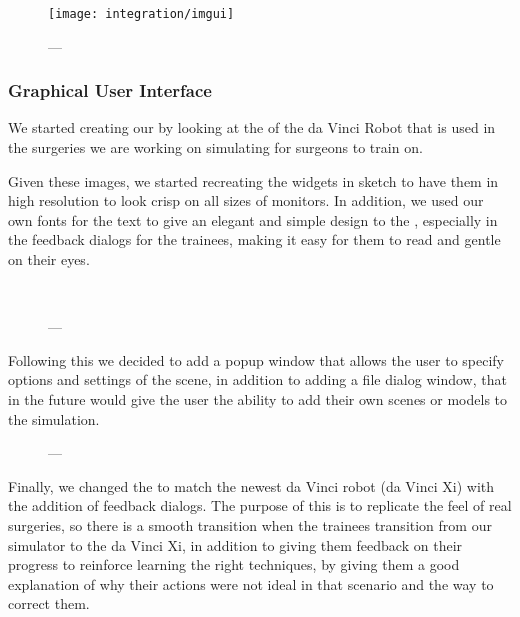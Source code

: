 \begin{figure}
  \centering%
  \texttt{[image: integration/imgui]}
  \caption{---}
  \label{fig:}
\end{figure}

\subsubsection{Graphical User Interface}
\label{ssec:gui}
We started creating our  by looking at the  of the da Vinci Robot that is used in the surgeries we are working on simulating for surgeons to train on.

Given these images, we started recreating the widgets in sketch to have them in high resolution to look crisp on all sizes of monitors. In addition, we used our own fonts for the text to give an elegant and simple design to the , especially in the feedback dialogs for the trainees, making it easy for them to read and gentle on their eyes.

\begin{figure}
  \centering%
  \setlength{\fboxsep}{0pt}%
  \setlength{\fboxrule}{0.1pt}%
  \\[1ex]
  \caption{---}
  \label{fig:}
\end{figure}

Following this we decided to add a popup window that allows the user to specify options and settings of the scene, in addition to adding a file dialog window, that in the future would give the user the ability to add their own scenes or models to the simulation.

\begin{figure}
    \centering%
    \setlength{\fboxsep}{0pt}%
    \setlength{\fboxrule}{0.1pt}%
    \caption{---}
\end{figure}

Finally, we changed the  to match the newest da Vinci robot (da Vinci Xi) with the addition of feedback dialogs. The purpose of this is to replicate the feel of real surgeries, so there is a smooth transition when the trainees transition from our simulator to the da Vinci Xi, in addition to giving them feedback on their progress to reinforce learning the right techniques, by giving them a good explanation of why their actions were not ideal in that scenario and the way to correct them.

